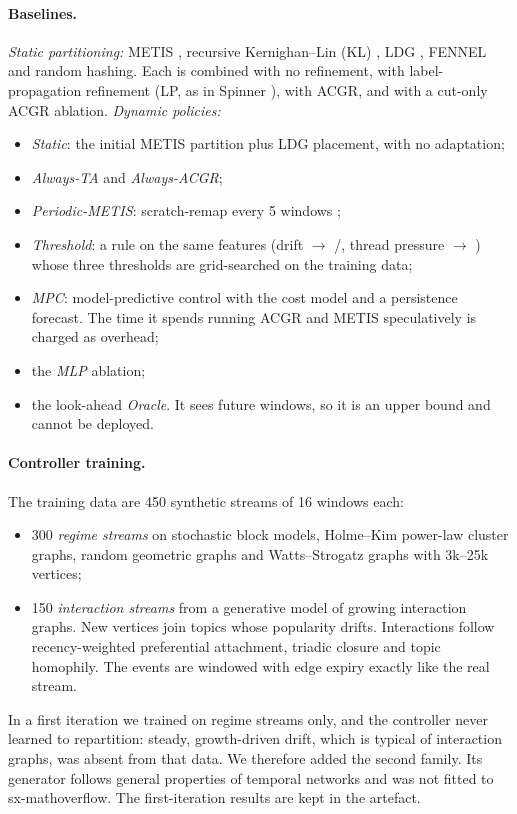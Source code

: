 \paragraph{Baselines.}
\emph{Static partitioning:} METIS \cite{karypis1998metis}, recursive Kernighan--Lin (KL)
\cite{kernighan1970}, LDG \cite{stanton2012ldg}, FENNEL \cite{tsourakakis2014fennel} and
random hashing. Each is combined with no refinement, with label-propagation refinement (LP, as
in Spinner \cite{martella2017spinner}), with ACGR, and with a cut-only ACGR ablation.
\emph{Dynamic policies:}
\begin{itemize}
  \item \emph{Static}: the initial METIS partition plus LDG placement, with no adaptation;
  \item \emph{Always-TA} and \emph{Always-ACGR};
  \item \emph{Periodic-METIS}: scratch-remap every 5 windows \cite{schloegel2000unified};
  \item \emph{Threshold}: a rule on the same features (drift $\to$ \RB{}/\RP{}, thread
        pressure $\to$ \TA{}) whose three thresholds are grid-searched on the training data;
  \item \emph{MPC}: model-predictive control with the cost model and a persistence forecast.
        The time it spends running ACGR and METIS speculatively is charged as overhead;
  \item the \emph{MLP} ablation;
  \item the look-ahead \emph{Oracle}. It sees future windows, so it is an upper bound and cannot
        be deployed.
\end{itemize}

\paragraph{Controller training.}
The training data are 450 synthetic streams of 16 windows each:
\begin{itemize}
  \item 300 \emph{regime streams} on stochastic block models, Holme--Kim power-law cluster
        graphs, random geometric graphs and Watts--Strogatz graphs with 3k--25k vertices;
  \item 150 \emph{interaction streams} from a generative model of growing interaction graphs.
        New vertices join topics whose popularity drifts. Interactions follow
        recency-weighted preferential attachment, triadic closure and topic homophily. The
        events are windowed with edge expiry exactly like the real stream.
\end{itemize}
In a first iteration we trained on regime streams only, and the controller never learned to
repartition: steady, growth-driven drift, which is typical of interaction graphs, was absent
from that data. We therefore added the second family. Its generator follows general properties
of temporal networks and was not fitted to sx-mathoverflow. The first-iteration results are
kept in the artefact.

